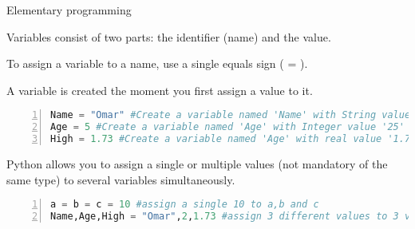 \begin{frame}[fragile]{Elementary programming}
\begin{block}{}
    Variables consist of two parts: the identifier (name)  and the value.
\end{block}


To assign a variable to a name, use a single equals sign ( = ).


A variable is created the moment you first assign a value to it.
\pause 
\begin{lstlisting}[numbers=left,showstringspaces=false,language=python]
Name = "Omar" #Create a variable named 'Name' with String value 'Omar'
Age = 5 #Create a variable named 'Age' with Integer value '25'
High = 1.73 #Create a variable named 'Age' with real value '1.73'
\end{lstlisting}
\pause 
Python allows you to assign a single or multiple values (not mandatory of the same type) to several variables simultaneously.
\begin{lstlisting}[numbers=left,showstringspaces=false,language=python]
a = b = c = 10 #assign a single 10 to a,b and c
Name,Age,High = "Omar",2,1.73 #assign 3 different values to 3 variables.
\end{lstlisting}
\end{frame}

